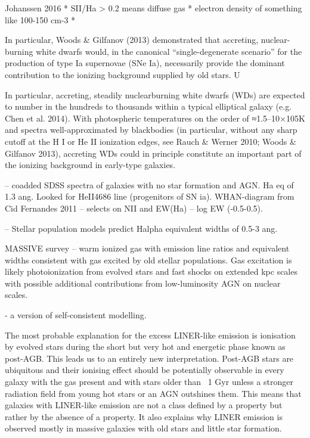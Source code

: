 Johanssen 2016
* SII/Ha > 0.2 means diffuse gas
* electron density of something like 100-150 cm-3
*

In particular, Woods & Gilfanov (2013) demonstrated
that accreting, nuclear-burning white dwarfs would, in the
canonical “single-degenerate scenario” for the production of
type Ia supernovae (SNe Ia), necessarily provide the dominant
contribution to the ionizing background supplied by
old stars. U

In particular, accreting, steadily nuclearburning
white dwarfs (WDs) are expected to number in the
hundreds to thousands within a typical elliptical galaxy (e.g.
Chen et al. 2014). With photospheric temperatures on the
order of ≈1.5–10×105K and spectra well-approximated by
blackbodies (in particular, without any sharp cutoff at the
H I or He II ionization edges, see Rauch & Werner 2010;
Woods & Gilfanov 2013), accreting WDs could in principle
constitute an important part of the ionizing background in
early-type galaxies.

\citet{Johansson+2016} -- coadded SDSS spectra of galaxies with no star formation and AGN. Ha eq of 1.3 ang. Looked for HeII4686 line (progenitors of SN ia).
WHAN-diagram from Cid Fernandes 2011 -- selects on NII and EW(Ha) -- log EW (-0.5-0.5).

\citet{Gomes+2016, Belfiore+2016} -- Stellar population models predict Halpha equivalent widths of 0.5-3 ang.

\citet{Pandya+2017} MASSIVE survey -- warm ionized gas with emission line ratios and equivalent widths consistent with gas excited by old stellar populations. Gas excitation is likely photoionization from evolved stars and fast shocks on extended kpc scales with possible additional contributions from low-luminosity AGN on nuclear scales. 

\citet{Hirschmann+2017} - a version of self-consistent modelling.

\citet{Singh+2013}The most probable explanation for the excess LINER-like emission is ionisation by evolved stars during the short but very hot and energetic phase known as post-AGB. This leads us to an entirely new interpretation. Post-AGB stars are ubiquitous and their ionising effect should be potentially observable in every galaxy with the gas present and with stars older than ~1 Gyr unless a stronger radiation field from young hot stars or an AGN outshines them. This means that galaxies with LINER-like emission are not a class defined by a property but rather by the absence of a property. It also explains why LINER emission is observed mostly in massive galaxies with old stars and little star formation.

